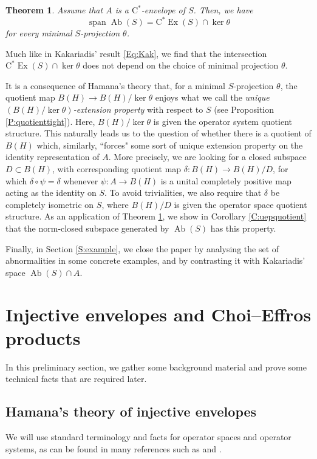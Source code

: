 \documentclass[10pt]{amsart}
\newcommand{\rC}{\mathrm{C}}
\newcommand{\Ab}{\operatorname{Ab}}
\newcommand{\Exp}{\operatorname{Ex}}
\newcommand{\spn}{\operatorname{span}}
\newtheorem{theoremx}{Theorem}
\theoremstyle{definition}
\begin{document}
 
\begin{theoremx}\label{T:B}
Assume that $A$ is a $\rC^*$-envelope of $S$. Then,
we have  \[\spn \Ab(S)=\rC^*\Exp(S)\cap \ker \theta\] for every minimal $S$-projection $\theta$.
\end{theoremx}

Much like in Kakariadis' result \eqref{Eq:Kak}, we find that the intersection $\rC^*\Exp(S)\cap \ker\theta$ does not depend on the choice of minimal projection $\theta$.

It is a consequence of Hamana's theory  that, for a minimal $S$-projection $\theta$, the quotient map $B(H)\to B(H)/\ker \theta$  enjoys what we call the \emph{unique $(B(H)/\ker \theta)$-extension property} with respect to $S$ (see Proposition \ref{P:quotienttight}). Here, $B(H)/\ker \theta$ is given the operator system quotient structure.
This naturally leads us to the question of whether there is a quotient of $B(H)$ which, similarly, ``forces" some sort of unique extension property on the identity representation of $A$.
More precisely, we are looking for a closed subspace $D\subset B(H)$, with corresponding quotient map $\delta:B(H)\to B(H)/D$, for which $\delta\circ \psi=\delta$ whenever  $\psi:A\to B(H)$ is a unital completely positive map acting as the identity on $S$.  To avoid trivialities, we also require that $\delta$ be completely isometric on $S$, where $B(H)/D$ is given the operator space quotient structure. As an application of Theorem \ref{T:B}, we show in Corollary \ref{C:uepquotient} that the norm-closed subspace generated by $\Ab(S)$ has this property.

Finally, in Section \ref{S:example}, we close the paper by analysing the set of abnormalities in some concrete examples, and by contrasting it with Kakariadis' space $\Ab(S)\cap A$.


\section{Injective envelopes and Choi--Effros products}\label{S:injenv}

In this preliminary section, we gather some background material and prove some technical facts that are required later.

\subsection{Hamana's theory of injective envelopes}

We will use standard terminology and facts for operator spaces and operator systems, as can be found in many references such as \cite{ER2022} and \cite{paulsen2002}.
\end{document}
